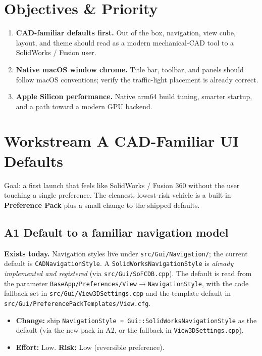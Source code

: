 \documentclass[11pt]{article}
\begin{document}
\section{Objectives \& Priority}
\begin{enumerate}[label=\textbf{\arabic*.}]
  \item \textbf{CAD-familiar defaults first.} Out of the box, navigation, view cube,
  layout, and theme should read as a modern mechanical-CAD tool to a SolidWorks /
  Fusion user.
  \item \textbf{Native macOS window chrome.} Title bar, toolbar, and panels should
  follow macOS conventions; verify the traffic-light placement is already correct.
  \item \textbf{Apple Silicon performance.} Native arm64 build tuning, smarter
  startup, and a path toward a modern GPU backend.
\end{enumerate}

\section{Workstream A \; \; CAD-Familiar UI Defaults}

Goal: a first launch that feels like SolidWorks / Fusion 360 without the user
touching a single preference. The cleanest, lowest-risk vehicle is a built-in
\textbf{Preference Pack} plus a small change to the shipped defaults.

\subsection{A1 \textemdash{} Default to a familiar navigation model}
\textbf{Exists today.} Navigation styles live under \texttt{src/Gui/Navigation/}; the
current default is \texttt{CADNavigationStyle}. A \texttt{SolidWorksNavigationStyle} is
\emph{already implemented and registered} (via \texttt{src/Gui/SoFCDB.cpp}). The default
is read from the parameter \texttt{BaseApp/Preferences/View$\rightarrow$NavigationStyle},
with the code fallback set in \texttt{src/Gui/View3DSettings.cpp} and the template
default in \texttt{src/Gui/PreferencePackTemplates/View.cfg}.
\begin{itemize}
  \item \textbf{Change:} ship \texttt{NavigationStyle = Gui::SolidWorksNavigationStyle}
  as the default (via the new pack in A2, or the fallback in \texttt{View3DSettings.cpp}).
  \item \textbf{Effort:} Low. \quad\textbf{Risk:} Low (reversible preference).
\end{itemize}
\end{document}
